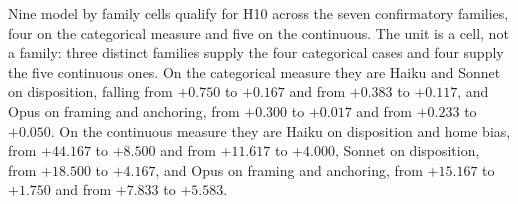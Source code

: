 \label{sec:h10cases}\label{app:h10cases}
Nine model by family cells qualify for H10 across the seven confirmatory
families, four on the categorical measure and five on the continuous. The
unit is a cell, not a family: three distinct families supply the four
categorical cases and four supply the five continuous ones. On the
categorical measure they are Haiku and Sonnet on disposition, falling from
$+0.750$ to $+0.167$ and from $+0.383$ to $+0.117$, and Opus on framing and
anchoring, from $+0.300$ to $+0.017$ and from $+0.233$ to $+0.050$. On the
continuous measure they are Haiku on disposition and home bias, from
$+44.167$ to $+8.500$ and from $+11.617$ to $+4.000$, Sonnet on disposition,
from $+18.500$ to $+4.167$, and Opus on framing and anchoring, from $+15.167$
to $+1.750$ and from $+7.833$ to $+5.583$.

